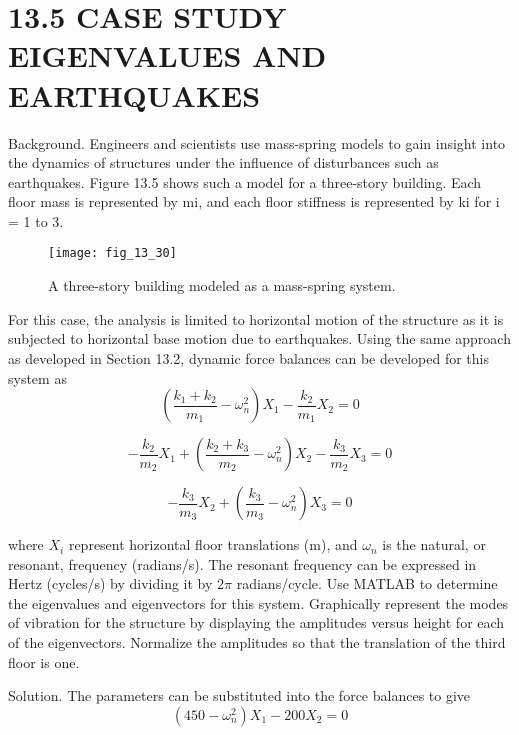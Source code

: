 \documentclass[../main.tex]{subfiles}
\begin{document}
\section*{13.5 CASE STUDY EIGENVALUES AND EARTHQUAKES}

Background. Engineers and scientists use mass-spring models to gain insight into
the dynamics of structures under the influence of disturbances such as earthquakes. Figure 13.5 shows such a model for a three-story building. Each floor mass is represented by
mi, and each floor stiffness is represented by ki for i = 1 to 3.
\begin{figure}[H]
		\centering
		\texttt{[image: fig\_13\_30]}
	   \caption{\textsf{A three-story building modeled as a mass-spring system.}}
	   \label{fig:fig_13_30}
\end{figure}

For this case, the analysis is limited to horizontal motion of the structure as it is subjected
to horizontal base motion due to earthquakes. Using the same approach as developed in
Section 13.2, dynamic force balances can be developed for this system as
\begin{equation}
\left ( \frac{k_{1}+k_{2}}{m_{1}}-\omega ^{2}_{n} \right )X_{1} - \frac{k_{2}}{m_{1}}X_{2}=0
\end{equation}

\begin{equation}
-\frac{k_{2}}{m_{2}}X_{1}+\left ( \frac{k_{2}+k_{3}}{m_{2}}-\omega ^{2}_{n} \right )X_{2}-\frac{k_{3}}{m_{2}}X_{3}=0
\end{equation}

\begin{equation}
-\frac{k_{3}}{m_{3}}X_{2}+\left ( \frac{k_{3}}{m_{3}}-\omega ^{2}_{n} \right )X_{3}=0
\end{equation}

where $X_{i}$ represent horizontal floor translations (m), and $\omega_{n}$ is the natural, or resonant, frequency (radians/s). The resonant frequency can be expressed in Hertz (cycles/s) by dividing it by $2\pi$ radians/cycle.
Use MATLAB to determine the eigenvalues and eigenvectors for this system. Graphically represent the modes of vibration for the structure by displaying the amplitudes versus height for each of the eigenvectors. Normalize the amplitudes so that the translation of
the third floor is one.

Solution. The parameters can be substituted into the force balances to give
\begin{equation}
\left ( 450-\omega^{2}_{n} \right )X_{1}-200X_{2}=0
\end{equation}
\end{document}
